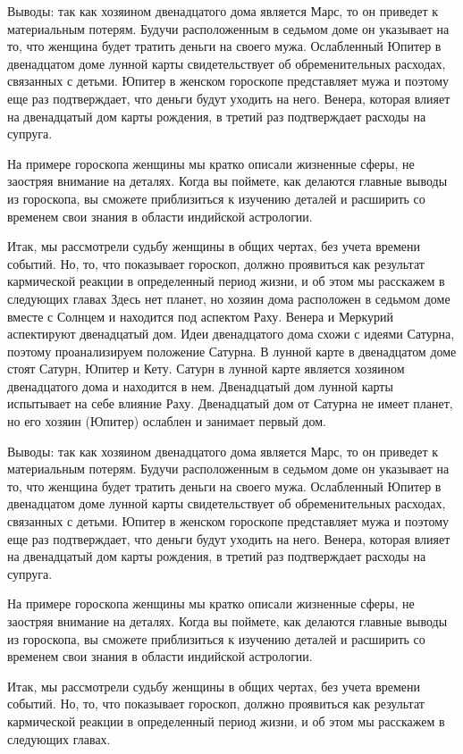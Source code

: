 Выводы: так как хозяином двенадцатого дома является Марс, то он приведет к материальным потерям. Будучи расположенным в седьмом доме он указывает на то, что женщина будет тратить деньги на своего мужа. Ослабленный Юпитер в двенадцатом доме лунной карты свидетельствует об обременительных расходах, связанных с детьми. Юпитер в женском гороскопе представляет мужа и поэтому еще раз подтверждает, что деньги будут уходить на него. Венера, которая влияет на двенадцатый дом карты рождения, в третий раз подтверждает расходы на супруга.

На примере гороскопа женщины мы кратко описали жизненные сферы, не заостряя внимание на деталях. Когда вы поймете, как делаются главные выводы из гороскопа, вы сможете приблизиться к изучению деталей и расширить со временем свои знания в области индийской астрологии.

Итак, мы рассмотрели судьбу женщины в общих чертах, без учета времени событий. Но, то, что показывает гороскоп, должно проявиться как результат кармической реакции в определенный период жизни, и об этом мы расскажем в следующих главах
Здесь нет планет, но хозяин дома расположен в седьмом доме вместе с Солнцем и находится под аспектом Раху. Венера и Меркурий аспектируют двенадцатый дом. Идеи двенадцатого дома схожи с идеями Сатурна, поэтому проанализируем положение Сатурна. В лунной карте в двенадцатом доме стоят Сатурн, Юпитер и Кету. Сатурн в лунной карте является хозяином двенадцатого дома и находится в нем. Двенадцатый дом лунной карты испытывает на себе влияние Раху. Двенадцатый дом от Сатурна не имеет планет, но его хозяин (Юпитер) ослаблен и занимает первый дом.

Выводы: так как хозяином двенадцатого дома является Марс, то он приведет к материальным потерям. Будучи расположенным в седьмом доме он указывает на то, что женщина будет тратить деньги на своего мужа. Ослабленный Юпитер в двенадцатом доме лунной карты свидетельствует об обременительных расходах, связанных с детьми. Юпитер в женском гороскопе представляет мужа и поэтому еще раз подтверждает, что деньги будут уходить на него. Венера, которая влияет на двенадцатый дом карты рождения, в третий раз подтверждает расходы на супруга.

На примере гороскопа женщины мы кратко описали жизненные сферы, не заостряя внимание на деталях. Когда вы поймете, как делаются главные выводы из гороскопа, вы сможете приблизиться к изучению деталей и расширить со временем свои знания в области индийской астрологии.

Итак, мы рассмотрели судьбу женщины в общих чертах, без учета времени событий. Но, то, что показывает гороскоп, должно проявиться как результат кармической реакции в определенный период жизни, и об этом мы расскажем в следующих главах.


